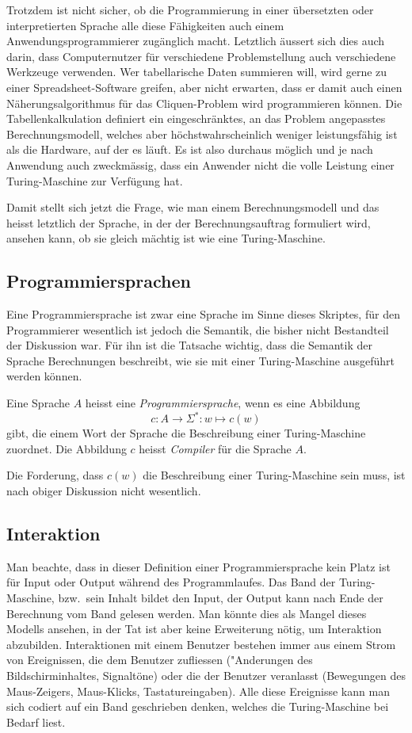 Trotzdem ist nicht sicher, ob die Programmierung in einer übersetzten
oder interpretierten Sprache alle diese Fähigkeiten auch einem
Anwendungsprogrammierer zugänglich macht.
Letztlich äussert sich dies auch darin, dass Computernutzer
für verschiedene Problemstellung auch verschiedene Werkzeuge
verwenden. Wer tabellarische Daten summieren will, wird gerne
zu einer Spreadsheet-Software greifen, aber nicht erwarten, dass er
damit auch einen Näherungsalgorithmus für das Cliquen-Problem wird
programmieren können. Die Tabellenkalkulation definiert ein eingeschränktes,
an das Problem angepasstes Berechnungsmodell, welches aber
höchstwahrscheinlich weniger leistungsfähig ist als die Hardware, auf
der es läuft. Es ist also durchaus möglich und je nach Anwendung auch
zweckmässig, dass ein Anwender nicht die volle Leistung einer
Turing-Maschine zur Verfügung hat.

Damit stellt sich jetzt die Frage, wie man einem Berechnungsmodell und
das heisst letztlich der Sprache, in der der Berechnungsauftrag
formuliert wird, ansehen kann, ob sie gleich mächtig ist wie eine
Turing-Maschine.

\subsection{Programmiersprachen}
Eine Programmiersprache ist zwar eine Sprache im Sinne dieses Skriptes,
für den Programmierer wesentlich ist jedoch die Semantik, die bisher
nicht Bestandteil der Diskussion war. Für ihn ist die Tatsache wichtig,
dass die Semantik der Sprache Berechnungen beschreibt,
wie sie mit einer Turing-Maschine ausgeführt werden können.

\begin{definition}
Eine Sprache $A$ heisst eine {\em Programmiersprache}, wenn es eine Abbildung
\[
c\colon A\to \Sigma^*\colon w\mapsto c(w)
\]
gibt, die einem Wort der Sprache die Beschreibung einer Turing-Maschine
zuordnet. Die Abbildung $c$ heisst {\em Compiler} für die Sprache $A$.
\end{definition}
Die Forderung, dass $c(w)$ die Beschreibung einer Turing-Maschine
sein muss, ist nach obiger Diskussion nicht wesentlich.

\subsection{Interaktion}
Man beachte, dass in dieser Definition einer Programmiersprache kein Platz ist
für Input oder Output während des Programmlaufes.
Das Band der Turing-Maschine, bzw.~sein Inhalt bildet den Input, der Output
kann nach Ende der Berechnung vom Band gelesen werden.
Man könnte dies als Mangel dieses Modells ansehen, in der Tat ist aber
keine Erweiterung nötig, um Interaktion abzubilden.
Interaktionen mit einem Benutzer bestehen immer aus einem Strom von
Ereignissen, die dem Benutzer zufliessen ("Anderungen des Bildschirminhaltes,
Signaltöne) oder die der Benutzer veranlasst (Bewegungen des Maus-Zeigers,
Maus-Klicks, Tastatureingaben). Alle diese Ereignisse kann man sich codiert
auf ein Band geschrieben denken, welches die Turing-Maschine bei Bedarf
liest.

